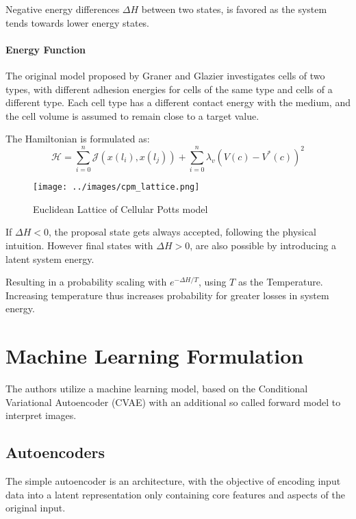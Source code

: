 \documentclass[a4paper,10pt,twocolumn]{article}
\begin{document}
        Negative energy differences $\Delta H$ between two states,
        is favored as the system tends towards lower energy states.

        \paragraph{Energy Function}
        The original model proposed by Graner and Glazier\cite{cellular_potts} investigates cells of two types, 
        with different adhesion energies for cells of the same type and cells of a 
        different type. Each cell type has a different contact energy with the 
        medium, and the cell volume is assumed to remain close to a target value. 
        
        The Hamiltonian is formulated as:
        \begin{equation}
            \mathcal{H} = \sum_{i=0}^{n} \mathcal{J}(x(l_i), x(l_j)) + \sum_{i=0}^{n} \lambda_v {(V(c) - V^*(c))}^2
            \label{eq:hamiltonian}
        \end{equation}

        \begin{figure}[H]
            \centering
            \texttt{[image: ../images/cpm\_lattice.png]}
            \caption{Euclidean Lattice of Cellular Potts model}\label{fig:cpm}
        \end{figure}

        If $\Delta H < 0$, the proposal state gets always accepted, following the physical intuition.
        However final states with $\Delta H > 0$, are also possible by introducing a latent system energy.
        
        Resulting in a probability scaling with $e^{-\Delta H / T}$, using $T$ as the Temperature.
        Increasing temperature thus increases probability for greater losses in system energy. 


    \section{Machine Learning Formulation}
    
        The authors utilize a machine learning model, based on the Conditional Variational Autoencoder (CVAE) with 
        an additional so called forward model to interpret images. 

        \subsection{Autoencoders}
            The simple autoencoder is an architecture, with the 
            objective of encoding input data into a latent representation only 
            containing core features and aspects of the original input\cite{weng_autocoders}.
            
\end{document}
